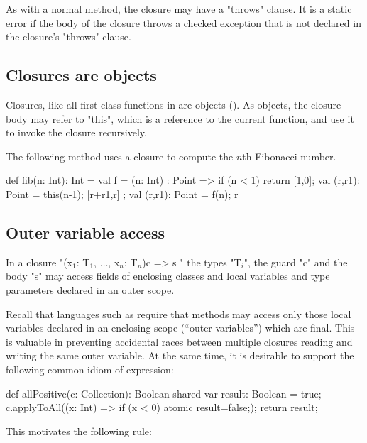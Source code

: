 As with a normal method, the closure may have a \xcd"throws"
clause. It is a static error if the body of the closure throws a
checked exception that is not declared in the closure's \xcd"throws"
clause.

\subsection{Closures are objects}

Closures, like all first-class functions in \Xten{} are
objects ().
As objects, the closure body may refer to
\xcd"this", which is a reference to the current function,
and use it to invoke the closure recursively.

\begin{example}
The following method uses a closure to compute the $n$th
Fibonacci number.
\begin{xten}
def fib(n: Int): Int = {
    val f = (n: Int) : Point => {
        if (n < 1) return [1,0];
        val (r,r1): Point = this(n-1);
        [r+r1,r]
    };
    val (r,r1): Point = f(n);
    r
}
\end{xten}
\end{example}

\subsection{Outer variable access}

In a closure
\xcdmath"(x$_1$: T$_1$, $\dots$, x$_n$: T$_n$){c} => { s }"
the types \xcdmath"T$_i$", the guard \xcd"c" and the body \xcd"s"
may access fields of enclosing classes and local variables and type
parameters declared in an outer scope.

Recall that languages such as \java{} require that methods may
access only those local variables declared in an enclosing scope
(``outer variables'') which are final. This is valuable in
preventing accidental races between multiple closures reading
and writing the same outer variable. At the same time, it is
desirable to support the following common idiom of expression:

\begin{xten}
def allPositive(c: Collection): Boolean {
  shared var result: Boolean = true;
  c.applyToAll((x: Int) => { if (x < 0) atomic {result=false;}});
  return result;
}
\end{xten}

This motivates the following rule:

